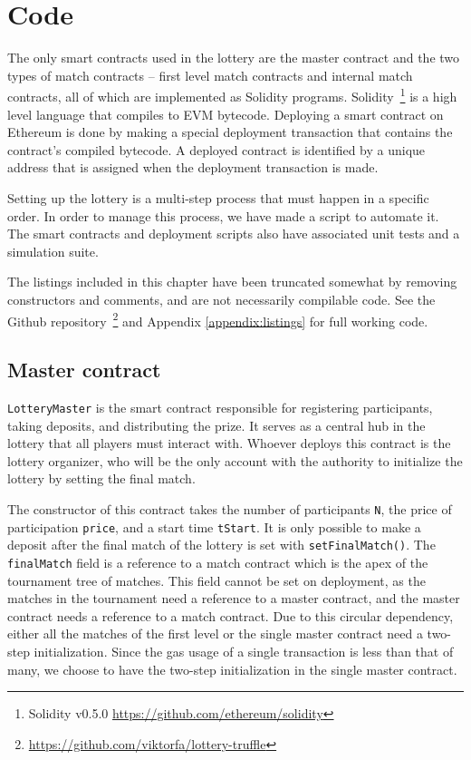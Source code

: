 \section{Code}
\label{sec:code}

The only smart contracts used in the lottery are the master contract and the two types of match contracts – first level match contracts and internal match contracts, all of which are implemented as Solidity programs. Solidity~\footnote{Solidity v0.5.0 \url{https://github.com/ethereum/solidity}} is a high level language that compiles to EVM bytecode. Deploying a smart contract on Ethereum is done by making a special deployment transaction that contains the contract's compiled bytecode. A deployed contract is identified by a unique address that is assigned when the deployment transaction is made.

Setting up the lottery is a multi-step process that must happen in a specific order. In order to manage this process, we have made a script to automate it. The smart contracts and deployment scripts also have associated unit tests and a simulation suite.

The listings included in this chapter have been truncated somewhat by removing constructors and comments, and are not necessarily compilable code. See the Github repository~\footnote{\url{https://github.com/viktorfa/lottery-truffle}} and Appendix \ref{appendix:listings} for full working code.

\subsection{Master contract}
\texttt{LotteryMaster} is the smart contract responsible for registering participants, taking deposits, and distributing the prize. It serves as a central hub in the lottery that all players must interact with. Whoever deploys this contract is the lottery organizer, who will be the only account with the authority to initialize the lottery by setting the final match. 

The constructor of this contract takes the number of participants \texttt{N}, the price of participation \texttt{price}, and a start time \texttt{tStart}. It is only possible to make a deposit after the final match of the lottery is set with \texttt{setFinalMatch()}. The \texttt{finalMatch} field is a reference to a match contract which is the apex of the tournament tree of matches. This field cannot be set on deployment, as the matches in the tournament need a reference to a master contract, and the master contract needs a reference to a match contract. Due to this circular dependency, either all the matches of the first level or the single master contract need a two-step initialization. Since the gas usage of a single transaction is less than that of many, we choose to have the two-step initialization in the single master contract.


